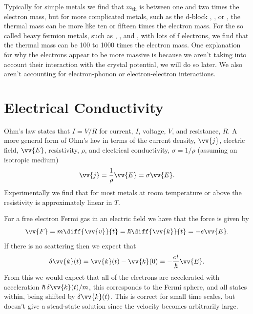 \documentclass[fleqn]{NotesClass}
\begin{document}
    Typically for simple metals we find that \(m_{\mathrm{th}}\) is between one and two times the electron mass, but for more complicated metals, such as the \(\mathrm{d}\)-block , , or , the thermal mass can be more like ten or fifteen times the electron mass.
    For the so called heavy fermion metals, such as , , and , with lots of \(\mathrm{f}\) electrons, we find that the thermal mass can be 100 to \num{1000} times the electron mass.
    One explanation for why the electrons appear to be more massive is because we aren't taking into account their interaction with the crystal potential, we will do so later.
    We also aren't accounting for electron-phonon or electron-electron interactions.
    
    \section{Electrical Conductivity}
    Ohm's law states that \(I = V/R\) for current, \(I\), voltage, \(V\), and resistance, \(R\).
    A more general form of Ohm's law in terms of the current density, \(\vv{j}\), electric field, \(\vv{E}\), resistivity, \(\rho\), and electrical conductivity, \(\sigma = 1/\rho\) (assuming an isotropic medium)
    \begin{equation}
        \vv{j} = \frac{1}{\rho} \vv{E} = \sigma \vv{E}.
    \end{equation}
    Experimentally we find that for most metals at room temperature or above the resistivity is approximately linear in \(T\).
    
    For a free electron Fermi gas in an electric field we have that the force is given by
    \begin{equation}
        \vv{F} = m \diff{\vv{v}}{t} = \hbar\diff{\vv{k}}{t} = -e\vv{E}.
    \end{equation}
    If there is no scattering then we expect that
    \begin{equation}
        \delta\vv{k}(t) = \vv{k}(t) - \vv{k}(0) = -\frac{et}{\hbar}\vv{E}.
    \end{equation}
    From this we would expect that all of the electrons are accelerated with acceleration \(\hbar\,\delta\vv{k}(t)/m\), this corresponds to the Fermi sphere, and all states within, being shifted by \(\delta\vv{k}(t)\).
    This is correct for small time scales, but doesn't give a stead-state solution since the velocity becomes arbitrarily large.
    
\end{document}
